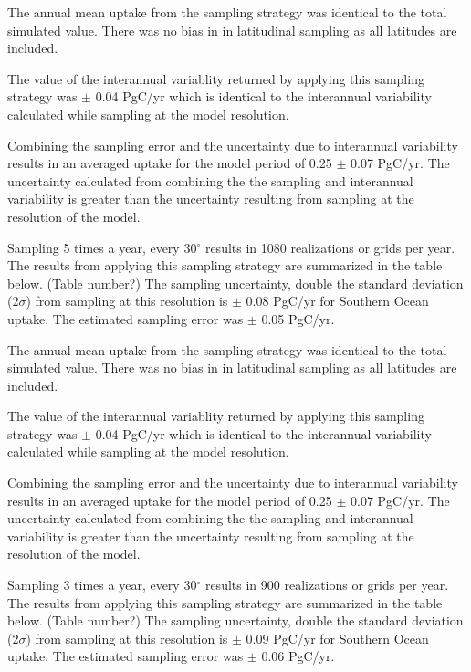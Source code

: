 \documentclass[11pt, a4paper]{article}
\numberwithin{figure}{section}
\numberwithin{table}{section}
\begin{document}
The annual mean uptake from the sampling strategy was identical to 
the total simulated value. There was no bias in in latitudinal sampling
as all latitudes are included.

The value of the interannual variablity returned by applying this
sampling strategy was $\pm$ 0.04 PgC/yr which is identical to the 
interannual variability calculated while sampling at the model 
resolution. 

Combining the sampling error and the uncertainty due to interannual
variability results in an averaged uptake for the model period of 
0.25 $\pm$ 0.07 PgC/yr.
The uncertainty calculated from combining the the sampling and 
interannual variability is greater than the uncertainty resulting from
sampling at the resolution of the model.


Sampling 5 times a year, every 30$^{\circ}$ results in 1080 realizations 
or grids per year. The results from applying this sampling strategy are
summarized in the table below. (Table number?)
The sampling uncertainty, double the standard deviation (2$\sigma$) 
from sampling at this resolution is
$\pm$ 0.08 PgC/yr for Southern Ocean uptake.
The estimated sampling error was 
$\pm$ 0.05 PgC/yr. %

The annual mean uptake from the sampling strategy was identical to 
the total simulated value. There was no bias in in latitudinal sampling
as all latitudes are included.

The value of the interannual variablity returned by applying this
sampling strategy was $\pm$ 0.04 PgC/yr which is identical to the 
interannual variability calculated while sampling at the model 
resolution. 

Combining the sampling error and the uncertainty due to interannual
variability results in an averaged uptake for the model period of 
0.25 $\pm$ 0.07 PgC/yr.
The uncertainty calculated from combining the the sampling and 
interannual variability is greater than the uncertainty resulting from
sampling at the resolution of the model.


Sampling 3 times a year, every 30$^{\circ}$ results in 900 realizations 
or grids per year. The results from applying this sampling strategy are
summarized in the table below. (Table number?)
The sampling uncertainty, double the standard deviation (2$\sigma$) 
from sampling at this resolution is
$\pm$ 0.09 PgC/yr for Southern Ocean uptake.
The estimated sampling error was 
$\pm$ 0.06 PgC/yr. %
\end{document}
